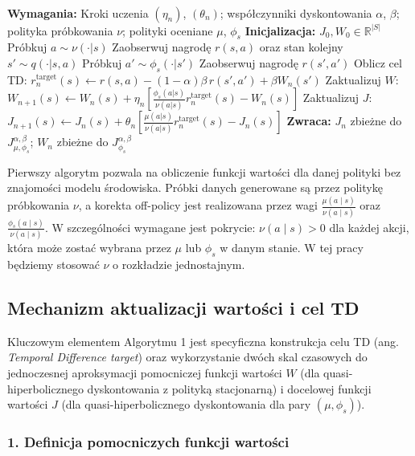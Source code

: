 \begin{algorithm}[H] \
\caption{Obliczenie funkcji wartości dla dyskontowania QH \cite{eshwar2025}}
\label{alg:policy-eval}
\begin{algorithmic}[1]
\STATE \textbf{Wymagania:} Kroki uczenia $(\eta_n)$, $(\theta_n)$; współczynniki dyskontowania $\alpha$, $\beta$; polityka próbkowania $\nu$; polityki oceniane $\mu$, $\phi_s$
\STATE \textbf{Inicjalizacja:} $J_0, W_0 \in \mathbb{R}^{|S|}$
\STATE Próbkuj $a \sim \nu(\cdot|s)$
\STATE Zaobserwuj nagrodę $r(s, a)$ oraz stan kolejny $s' \sim q(\cdot|s, a)$
\STATE Próbkuj $a' \sim \phi_s(\cdot|s')$
\STATE Zaobserwuj nagrodę $r(s', a')$
\STATE Oblicz cel TD: $r^{\text{target}}_n(s) \leftarrow r(s, a) - (1 - \alpha)\beta \, r(s', a') + \beta W_n(s')$
\STATE Zaktualizuj $W$: $W_{n+1}(s) \leftarrow W_n(s) + \eta_n \left[ \frac{\phi_s(a|s)}{\nu(a|s)} r^{\text{target}}_n(s) - W_n(s) \right]$
\STATE Zaktualizuj $J$: $J_{n+1}(s) \leftarrow J_n(s) + \theta_n \left[ \frac{\mu(a|s)}{\nu(a|s)} r^{\text{target}}_n(s) - J_n(s) \right]$
\ENDFOR
\ENDFOR
\STATE \textbf{Zwraca:} $J_n$ zbieżne do $J^{\alpha, \beta}_{\mu, \phi_s}$; $W_n$ zbieżne do $J^{\alpha, \beta}_{\phi_s}$
\end{algorithmic}
\end{algorithm}


Pierwszy algorytm pozwala na obliczenie funkcji wartości dla danej polityki bez znajomości modelu środowiska. Próbki danych generowane są przez politykę próbkowania $\nu$, a korekta off-policy jest realizowana przez wagi $\frac{\mu(a\mid s)}{\nu(a\mid s)}$ oraz $\frac{\phi_s(a\mid s)}{\nu(a\mid s)}$. W szczególności wymagane jest pokrycie: $\nu(a\mid s) > 0$ dla każdej akcji, która może zostać wybrana przez $\mu$ lub $\phi_s$ w danym stanie. W tej pracy będziemy stosować $\nu$ o rozkładzie jednostajnym.
\subsection{Mechanizm aktualizacji wartości i cel TD}

Kluczowym elementem Algorytmu 1 jest specyficzna konstrukcja celu TD (ang. \textit{Temporal Difference target}) oraz wykorzystanie dwóch skal czasowych do jednoczesnej aproksymacji pomocniczej funkcji wartości $W$ (dla quasi-hiperbolicznego dyskontowania z polityką stacjonarną) i docelowej funkcji wartości $J$ (dla quasi-hiperbolicznego dyskontowania dla pary $(\mu, \phi_s)$). 

\subsubsection*{1. Definicja pomocniczych funkcji wartości}

